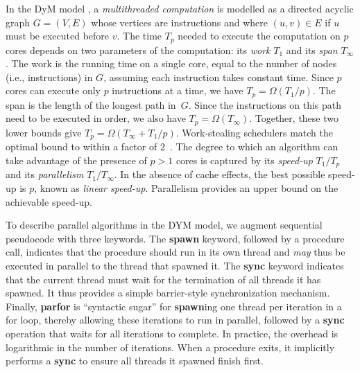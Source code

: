 In the DyM model \cite[Chapter~27]{Cormen2009}, a {\em multithreaded
computation} is modelled as a directed acyclic graph $G=(V,E)$
whose vertices are instructions and where $(u,v) \in E$ if
$u$ must be executed before $v$.  The time $T_p$ needed to execute the
computation on $p$ cores depends on two parameters of the computation:
its {\em work} $T_1$ and its {\em span} $T_\infty$.  The work is the
running time on a single core, equal to the number of nodes
(i.e., instructions) in $G$, assuming each instruction takes constant
time.  Since $p$ cores can execute only $p$ instructions at a time, we
have $T_p = \Omega(T_1/p)$.  The span is the length of the longest
path in~$G$.  Since the instructions on this path need to be executed
in order, we also have $T_p = \Omega(T_\infty)$.
Together, these two lower bounds give $T_p = \Omega(T_\infty +
T_1/p)$.
Work-stealing schedulers match the optimal bound to within
a factor of 2~\cite{Blumofe:1999:SMC:324133.324234}.  The degree to
which an algorithm can take advantage of the presence of $p > 1$ cores
is captured by its {\em speed-up} $T_1 / T_p$ and its {\em
parallelism} $T_1 / T_\infty$.  In the absence of cache effects, the
best possible speed-up is $p$, known as {\em linear speed-up}.
Parallelism provides an upper bound on the achievable speed-up.

To describe parallel algorithms in the DYM model, we augment
sequential pseudocode with three keywords.  The {\bf spawn} keyword,
followed by a procedure call, indicates that the procedure should run
in its own thread and {\em may} thus be executed in parallel to the
thread that spawned it.  The {\bf sync} keyword
indicates that the current thread must wait for the termination of all
threads it has spawned.  It thus provides a
simple barrier-style synchronization mechanism.  Finally, {\bf parfor}
is ``syntactic sugar'' for {\bf spawn}ing one thread per iteration in
a for loop, thereby allowing these iterations to run in parallel,
followed by a {\bf sync} operation that waits for all iterations to
complete.  In practice, the overhead is logarithmic in the number of
iterations.  When a procedure exits, it implicitly performs a {\bf sync} to
ensure all threads it spawned finish first.
